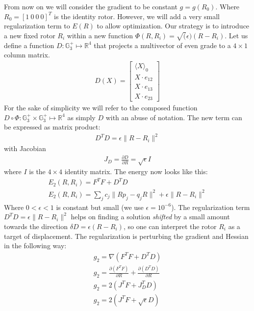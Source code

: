 \documentclass{birkjour}
\numberwithin{equation}{section}
\begin{document}
From now on we will consider the gradient to be constant $g = g(R_0)$. Where $R_0 = [1 \ 0 \ 0 \ 0]^T$ is the identity rotor. However, we will add a very small regularization term to $E(R)$ to allow optimization. Our strategy is to introduce a new fixed rotor $R_i$ within a new function $\Phi(R, R_i) = \sqrt(\epsilon) (R - R_i)$. Let us define a function $D : \mathbb{G}^{+}_3 \mapsto \mathbb{R}^4$ that projects a multivector of even grade to a $4\times1$ column matrix.
\begin{eqnarray*}
D(X) = 
\left[\begin{array}{c} \langle X \rangle_0 \\ X \cdot e_{12} \\ X \cdot e_{13} \\ X \cdot e_{23}\end{array}\right]
\end{eqnarray*}
For the sake of simplicity we will refer to the composed function $D \circ \Phi:\mathbb{G}^{+}_3 \times \mathbb{G}^{+}_3 \mapsto \mathbb{R}^4$ as simply $D$ with an abuse of notation. The new term can be expressed as matrix product:
\begin{eqnarray*}
D^T D = \epsilon \|R - R_i\|^2
\end{eqnarray*}
with Jacobian 
\begin{eqnarray*}
J_D = \frac{\partial D}{\partial R} = \sqrt{\epsilon} I
\end{eqnarray*}
where $I$ is the $4\times4$ identity matrix. The energy now looks like this:
\begin{eqnarray*}
E_2(R, R_i) = F^T F + D^T D\\
E_2(R, R_i) = \sum_j { c_{j} \|R p_j - q_j R\|^2 } + \epsilon \|R - R_i\|^2
\end{eqnarray*}
Where $0 < \epsilon < 1$ is constant but small (we use $\epsilon = 10^{-6}$). The regularization term $D^T D = \epsilon \|R - R_i\|^2$ helps on finding a solution \emph{shifted} by a small amount towards the direction $\delta D = \epsilon (R - R_i)$, so one can interpret the rotor $R_i$ as a target of displacement. The regularization is perturbing the gradient and Hessian in the following way:
\begin{eqnarray*}
g_2 = \nabla(F^T F + D^T D)\\
g_2 = \frac{\partial (F^T F)}{\partial R} + \frac{\partial (D^T D)}{\partial R}\\
g_2 = 2 (J^T F + J_D^T D)\\
g_2 = 2 (J^T F + \sqrt{\epsilon} D)
\end{eqnarray*}
\end{document}
